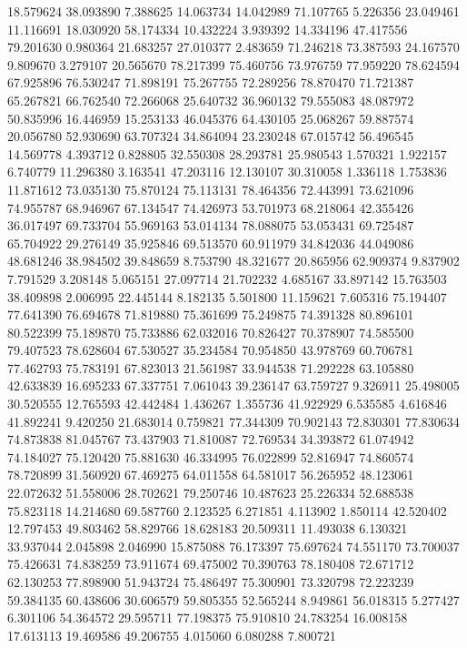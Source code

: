 18.579624
38.093890
7.388625
14.063734
14.042989
71.107765
5.226356
23.049461
11.116691
18.030920
58.174334
10.432224
3.939392
14.334196
47.417556
79.201630
0.980364
21.683257
27.010377
2.483659
71.246218
73.387593
24.167570
9.809670
3.279107
20.565670
78.217399
75.460756
73.976759
77.959220
78.624594
67.925896
76.530247
71.898191
75.267755
72.289256
78.870470
71.721387
65.267821
66.762540
72.266068
25.640732
36.960132
79.555083
48.087972
50.835996
16.446959
15.253133
46.045376
64.430105
25.068267
59.887574
20.056780
52.930690
63.707324
34.864094
23.230248
67.015742
56.496545
14.569778
4.393712
0.828805
32.550308
28.293781
25.980543
1.570321
1.922157
6.740779
11.296380
3.163541
47.203116
12.130107
30.310058
1.336118
1.753836
11.871612
73.035130
75.870124
75.113131
78.464356
72.443991
73.621096
74.955787
68.946967
67.134547
74.426973
53.701973
68.218064
42.355426
36.017497
69.733704
55.969163
53.014134
78.088075
53.053431
69.725487
65.704922
29.276149
35.925846
69.513570
60.911979
34.842036
44.049086
48.681246
38.984502
39.848659
8.753790
48.321677
20.865956
62.909374
9.837902
7.791529
3.208148
5.065151
27.097714
21.702232
4.685167
33.897142
15.763503
38.409898
2.006995
22.445144
8.182135
5.501800
11.159621
7.605316
75.194407
77.641390
76.694678
71.819880
75.361699
75.249875
74.391328
80.896101
80.522399
75.189870
75.733886
62.032016
70.826427
70.378907
74.585500
79.407523
78.628604
67.530527
35.234584
70.954850
43.978769
60.706781
77.462793
75.783191
67.823013
21.561987
33.944538
71.292228
63.105880
42.633839
16.695233
67.337751
7.061043
39.236147
63.759727
9.326911
25.498005
30.520555
12.765593
42.442484
1.436267
1.355736
41.922929
6.535585
4.616846
41.892241
9.420250
21.683014
0.759821
77.344309
70.902143
72.830301
77.830634
74.873838
81.045767
73.437903
71.810087
72.769534
34.393872
61.074942
74.184027
75.120420
75.881630
46.334995
76.022899
52.816947
74.860574
78.720899
31.560920
67.469275
64.011558
64.581017
56.265952
48.123061
22.072632
51.558006
28.702621
79.250746
10.487623
25.226334
52.688538
75.823118
14.214680
69.587760
2.123525
6.271851
4.113902
1.850114
42.520402
12.797453
49.803462
58.829766
18.628183
20.509311
11.493038
6.130321
33.937044
2.045898
2.046990
15.875088
76.173397
75.697624
74.551170
73.700037
75.426631
74.838259
73.911674
69.475002
70.390763
78.180408
72.671712
62.130253
77.898900
51.943724
75.486497
75.300901
73.320798
72.223239
59.384135
60.438606
30.606579
59.805355
52.565244
8.949861
56.018315
5.277427
6.301106
54.364572
29.595711
77.198375
75.910810
24.783254
16.008158
17.613113
19.469586
49.206755
4.015060
6.080288
7.800721
